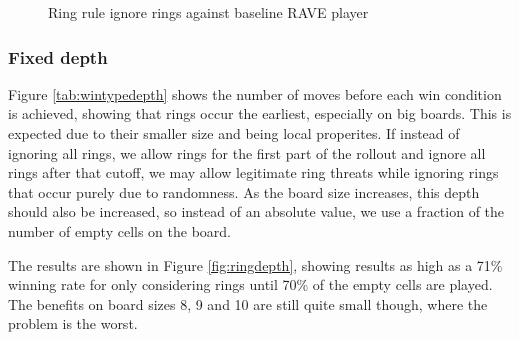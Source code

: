 \begin{figure}
	\centering
{}
	\caption{Ring rule ignore rings against baseline RAVE player}
	\label{fig:ringignore}
\end{figure}


\subsubsection{Fixed depth}

Figure \ref{tab:wintypedepth} shows the number of moves before each win condition is achieved, showing that rings occur the earliest, especially on big boards. This is expected due to their smaller size and being local properites. If instead of ignoring all rings, we allow rings for the first part of the rollout and ignore all rings after that cutoff, we may allow legitimate ring threats while ignoring rings that occur purely due to randomness. As the board size increases, this depth should also be increased, so instead of an absolute value, we use a fraction of the number of empty cells on the board.

The results are shown in Figure \ref{fig:ringdepth}, showing results as high as a 71\% winning rate for only considering rings until 70\% of the empty cells are played. The benefits on board sizes 8, 9 and 10 are still quite small though, where the problem is the worst.

